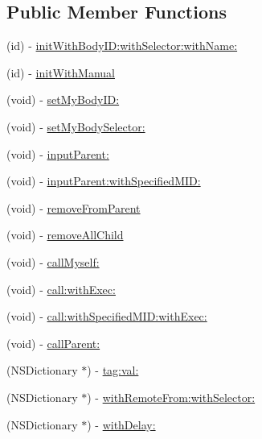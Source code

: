 \subsection*{Public Member Functions}
\begin{DoxyCompactItemize}
\item 
(id) -\/ \hyperlink{interface_messenger_system_a1127377a8d677d41693b435758790e79}{initWithBodyID:withSelector:withName:}
\item 
(id) -\/ \hyperlink{interface_messenger_system_a12fac5bf1d29c2b960e02dab4db80944}{initWithManual}
\item 
(void) -\/ \hyperlink{interface_messenger_system_a2a5f63ed86009e8b451bbbb621e9a94b}{setMyBodyID:}
\item 
(void) -\/ \hyperlink{interface_messenger_system_aafb5a2e5d48a09627f32a4d3c2e3fa29}{setMyBodySelector:}
\item 
(void) -\/ \hyperlink{interface_messenger_system_a2dc1b363d2e1b00f232fd829225a9ff3}{inputParent:}
\item 
(void) -\/ \hyperlink{interface_messenger_system_ae7f62ea0ebdb51b5f2628f3002add7e7}{inputParent:withSpecifiedMID:}
\item 
(void) -\/ \hyperlink{interface_messenger_system_a1b95b2f06c63a72a776c853d74e11b03}{removeFromParent}
\item 
(void) -\/ \hyperlink{interface_messenger_system_abfbdbb7d723b910d012d980daacbcd9b}{removeAllChild}
\item 
(void) -\/ \hyperlink{interface_messenger_system_a0d78a7be460a84be04e67d73ddcf4248}{callMyself:}
\item 
(void) -\/ \hyperlink{interface_messenger_system_ae9f0c6c7daf251eb28aad584b1eca292}{call:withExec:}
\item 
(void) -\/ \hyperlink{interface_messenger_system_ae923fe829663d8974dc34063bd32c4a2}{call:withSpecifiedMID:withExec:}
\item 
(void) -\/ \hyperlink{interface_messenger_system_acf758deab41281c54d928be2a72fc9ba}{callParent:}
\item 
(NSDictionary $\ast$) -\/ \hyperlink{interface_messenger_system_ad4e20b8da148b72f520986386c7fb8a5}{tag:val:}
\item 
(NSDictionary $\ast$) -\/ \hyperlink{interface_messenger_system_ad7b796c0354f4a6f380392421d4abc0d}{withRemoteFrom:withSelector:}
\item 
(NSDictionary $\ast$) -\/ \hyperlink{interface_messenger_system_ac424d46f571c01154893e4747a665930}{withDelay:}
\item 

\end{DoxyCompactItemize}
